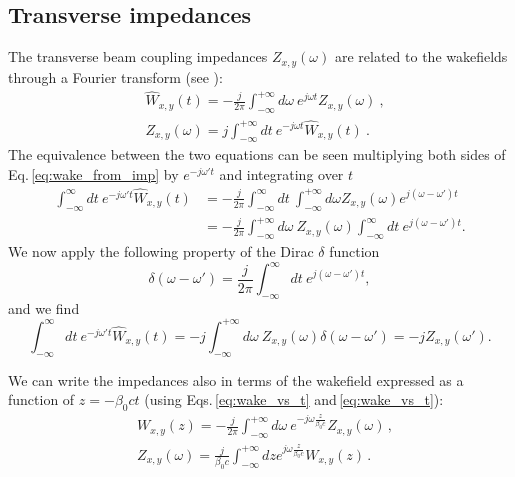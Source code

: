 \subsection{Transverse impedances}
The transverse beam coupling impedances $Z_{x,y}(\omega)$ are related to the wakefields through a Fourier transform (see \cite[Eq. 1.216]{Mounet:Thesis}):
\begin{align}
    &\widehat{W}_{x,y}(t) = -\frac{j}{2\pi}\int_{-\infty}^{+\infty} d\omega \ e^{j\omega t} Z_{x,y}(\omega)~,\label{eq:wake_from_imp}\\
    &Z_{x,y}(\omega) = j\int_{-\infty}^{+\infty} dt \ e^{-j\omega t} \widehat{W}_{x,y}(t)~.\label{eq:imp_from_wake}
\end{align}
The equivalence between the two equations can be seen multiplying both sides of Eq.\,\ref{eq:wake_from_imp} by $e^{-j\omega' t}$ and integrating over $t$
\begin{align}
    \int_{-\infty}^{\infty}dt \ e^{-j\omega' t}\widehat{W}_{x,y}(t) &= -\frac{j}{2\pi}\int_{-\infty}^{\infty}dt \ \int_{-\infty}^{+\infty} d\omega Z_{x,y}(\omega)e^{j(\omega-\omega') t}\\
    &= -\frac{j}{2\pi} \int_{-\infty}^{+\infty} d\omega \ Z_{x,y}(\omega) \int_{-\infty}^{\infty}dt \ e^{j(\omega-\omega') t}.
\end{align}
We now apply the following property of the Dirac $\delta$ function
\begin{equation}
    \delta(\omega-\omega') =  \frac{j}{2\pi} \int_{-\infty}^{\infty} dt \ e^{j(\omega-\omega') t},
\end{equation}
and we find
\begin{equation}
    \int_{-\infty}^{\infty}dt \ e^{-j\omega' t}\widehat{W}_{x,y}(t) = -j \int_{-\infty}^{+\infty} d\omega \ Z_{x,y}(\omega) \delta(\omega-\omega') = -j Z_{x, y}(\omega').
\end{equation}

We can write the impedances also in terms of the wakefield expressed as a function of $z= -\beta_0 c t$ (using Eqs.\,\ref{eq:wake_vs_t} and\,\ref{eq:wake_vs_t}):
\begin{align}
    &W_{x,y}(z) = -\frac{j}{2\pi}\int_{-\infty}^{+\infty} d\omega \ e^{-j\omega \frac{z}{\beta_0 c}} Z_{x,y}(\omega)\, ,\\
    &Z_{x,y}(\omega) = \frac{j}{\beta_0 c} \int_{-\infty}^{+\infty} dz e^{j \omega \frac{z}{\beta_0 c}} W_{x,y}(z)\, .
\end{align}



